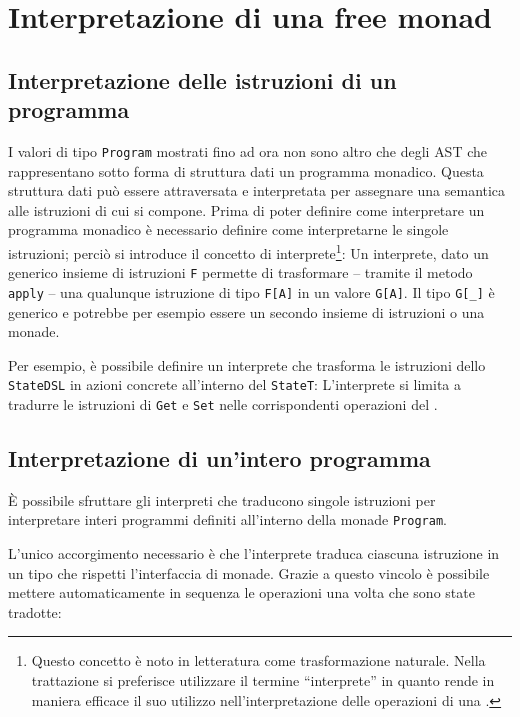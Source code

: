 \section{Interpretazione di una free monad}

\subsection{Interpretazione delle istruzioni di un programma}
I valori di tipo \lstinline{Program} mostrati fino ad ora non sono altro che degli \ac{AST} che rappresentano sotto forma di struttura dati un programma monadico.
Questa struttura dati può essere attraversata e interpretata per assegnare una semantica alle istruzioni di cui si compone.
Prima di poter definire come interpretare un programma monadico è necessario definire come interpretarne le singole istruzioni; perciò si introduce il concetto di interprete\footnote{Questo concetto è noto in letteratura come trasformazione naturale\cite{cit:monad-transformers-and-modular-algebraic-effects}. Nella trattazione si preferisce utilizzare il termine ``interprete''  in quanto rende in maniera efficace il suo utilizzo nell'interpretazione delle operazioni di una .}:
Un interprete, dato un generico insieme di istruzioni \lstinline{F} permette di trasformare -- tramite il metodo \lstinline{apply} -- una qualunque istruzione di tipo \lstinline{F[A]} in un valore \lstinline{G[A]}. Il tipo \lstinline{G[_]} è generico e potrebbe per esempio essere un secondo insieme di istruzioni o una monade.

Per esempio, è possibile definire un interprete che trasforma le istruzioni dello \lstinline{StateDSL} in azioni concrete all'interno del  \lstinline{StateT}:
L'interprete si limita a tradurre le istruzioni di \lstinline{Get} e \lstinline{Set} nelle corrispondenti operazioni del .

\subsection{Interpretazione di un'intero programma}
È possibile sfruttare gli interpreti che traducono singole istruzioni per interpretare interi programmi definiti all'interno della monade \lstinline{Program}.

L'unico accorgimento necessario è che l'interprete traduca ciascuna istruzione in un tipo che rispetti l'interfaccia di monade. Grazie a questo vincolo è possibile mettere automaticamente in sequenza le operazioni una volta che sono state tradotte:

